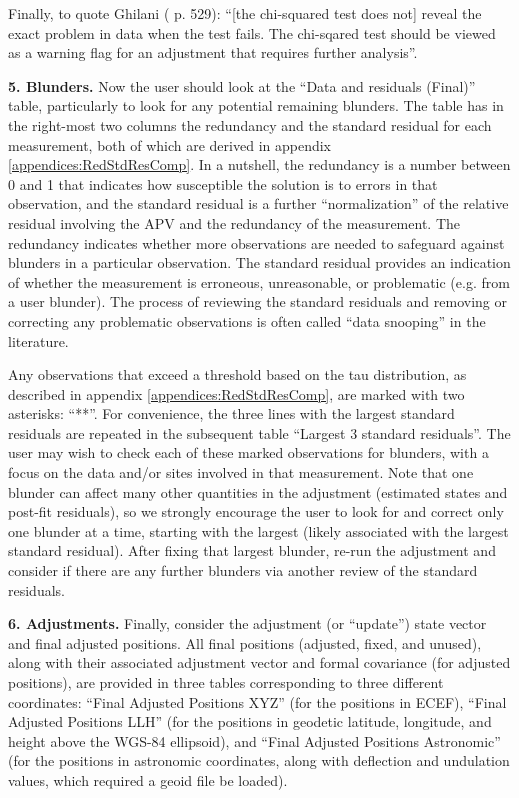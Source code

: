 Finally, to quote Ghilani (\cite{ghilani} p. 529): ``[the chi-squared test does not] reveal the exact problem in data when the test fails. The chi-sqared test should be viewed as a warning flag for an adjustment that requires further analysis''.

\textbf{5. Blunders.} Now the user should look at the ``Data and residuals (Final)'' table, particularly to look for any potential remaining blunders. The table has in the right-most two columns the redundancy and the standard residual for each measurement, both of which are derived in appendix \ref{appendices:RedStdResComp}. In a nutshell, the redundancy is a number between 0 and 1 that indicates how susceptible the solution is to errors in that observation, and the standard residual is a further ``normalization'' of the relative residual involving the APV and the redundancy of the measurement. The redundancy indicates whether more observations are needed to safeguard against blunders in a particular observation. The standard residual provides an indication of whether the measurement is erroneous, unreasonable, or problematic (e.g. from a user blunder). The process of reviewing the standard residuals and removing or correcting any problematic observations is often called ``data snooping'' in the literature. 

Any observations that exceed a threshold based on the tau distribution, as described in appendix \ref{appendices:RedStdResComp}, are marked with two asterisks: ``**''. For convenience, the three lines with the largest standard residuals are repeated in the subsequent table ``Largest 3 standard residuals''. The user may wish to check each of these marked observations for blunders, with a focus on the data and/or sites involved in that measurement. Note that one blunder can affect many other quantities in the adjustment (estimated states and post-fit residuals), so we strongly encourage the user to look for and correct only one blunder at a time, starting with the largest (likely associated with the largest standard residual). After fixing that largest blunder, re-run the adjustment and consider if there are any further blunders via another review of the standard residuals.

\textbf{6. Adjustments.} Finally, consider the adjustment (or ``update'') state vector and final adjusted positions. All final positions (adjusted, fixed, and unused), along with their associated adjustment vector and formal covariance (for adjusted positions), are provided in three tables corresponding to three different coordinates: ``Final Adjusted Positions XYZ'' (for the positions in ECEF), ``Final Adjusted Positions LLH'' (for the positions in geodetic latitude, longitude, and height above the WGS-84 ellipsoid), and ``Final Adjusted Positions Astronomic'' (for the positions in astronomic coordinates, along with deflection and undulation values, which required a geoid file be loaded).

